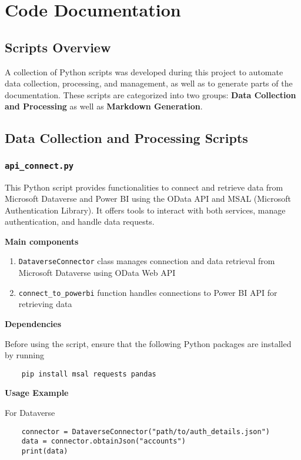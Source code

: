 \section{Code Documentation}
\label{sec:CodeDocumentation}

\subsection{Scripts Overview}

A collection of Python scripts was developed during this project to automate data collection, processing, and management, as well as to generate parts of the documentation. These scripts are categorized into two groups: \textbf{Data Collection and Processing} as well as \textbf{Markdown Generation}.

\subsection{Data Collection and Processing Scripts}

\subsubsection{\texttt{api\_connect.py}}

This Python script provides functionalities to connect and retrieve data from
Microsoft Dataverse and Power BI using the OData API and MSAL (Microsoft
Authentication Library). It offers tools to interact with both
services, manage authentication, and handle data requests.

\textbf{Main components}
\begin{enumerate}
	\item \texttt{DataverseConnector} class manages connection and data retrieval from Microsoft Dataverse using OData Web API
	\item \texttt{connect\_to\_powerbi} function handles connections to Power BI API for retrieving data
\end{enumerate}

\textbf{Dependencies}

Before using the script, ensure that the following Python packages are installed by running
\begin{verbatim}
	pip install msal requests pandas
\end{verbatim}

\textbf{Usage Example}

For Dataverse
\begin{verbatim}
	connector = DataverseConnector("path/to/auth_details.json")
	data = connector.obtainJson("accounts")
	print(data)
\end{verbatim}

